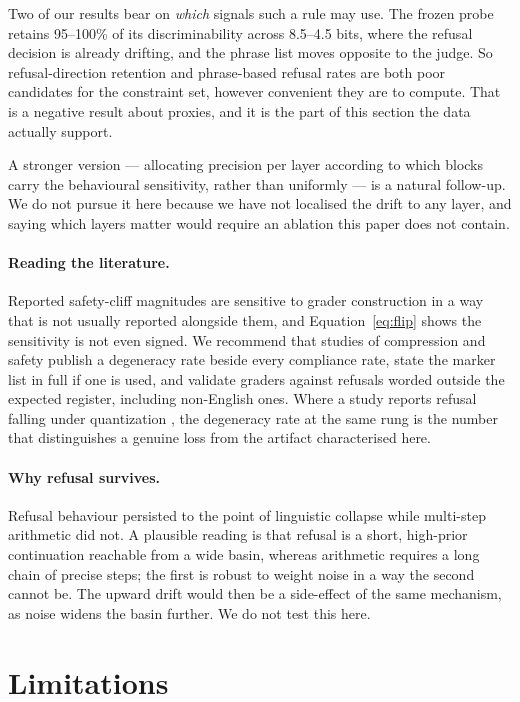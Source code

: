 \documentclass[11pt,a4paper]{article}
\begin{document}
Two of our results bear on \emph{which} signals such a rule may use. The frozen
probe retains 95--100\% of its discriminability across 8.5--4.5 bits, where the
refusal decision is already drifting, and the phrase list moves opposite to
the judge. So refusal-direction retention and phrase-based refusal rates are both
poor candidates for the constraint set, however convenient they are to compute.
That is a negative result about proxies, and it is the part of this section the
data actually support.

A stronger version --- allocating precision per layer according to which blocks
carry the behavioural sensitivity, rather than uniformly --- is a natural
follow-up. We do not pursue it here because we have not localised the drift to
any layer, and saying which layers matter would require an ablation this paper
does not contain.

\paragraph{Reading the literature.} Reported safety-cliff magnitudes are
sensitive to grader construction in a way that is not usually reported alongside
them, and Equation~\ref{eq:flip} shows the sensitivity is not even signed. We
recommend that studies of compression and safety publish a degeneracy rate beside
every compliance rate, state the marker list in full if one is used, and validate
graders against refusals worded outside the expected register, including
non-English ones. Where a study reports refusal falling under quantization
\citep{kadadekar2026quality}, the degeneracy rate at the same rung is the number
that distinguishes a genuine loss from the artifact characterised here.

\paragraph{Why refusal survives.} Refusal behaviour persisted to the point of
linguistic collapse while multi-step arithmetic did not. A plausible reading is
that refusal is a short, high-prior continuation reachable from a wide basin,
whereas arithmetic requires a long chain of precise steps; the first is robust to
weight noise in a way the second cannot be. The upward drift would then be a
side-effect of the same mechanism, as noise widens the basin further. We do not
test this here.

\section{Limitations}
\label{sec:limits}
\end{document}
